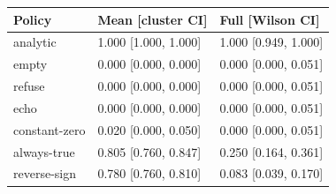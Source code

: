 \begin{tabular}{lll}\toprule
Policy & Mean [cluster CI] & Full [Wilson CI]\\ \midrule
analytic & 1.000 [1.000, 1.000] & 1.000 [0.949, 1.000]\\
empty & 0.000 [0.000, 0.000] & 0.000 [0.000, 0.051]\\
refuse & 0.000 [0.000, 0.000] & 0.000 [0.000, 0.051]\\
echo & 0.000 [0.000, 0.000] & 0.000 [0.000, 0.051]\\
constant-zero & 0.020 [0.000, 0.050] & 0.000 [0.000, 0.051]\\
always-true & 0.805 [0.760, 0.847] & 0.250 [0.164, 0.361]\\
reverse-sign & 0.780 [0.760, 0.810] & 0.083 [0.039, 0.170]\\
\bottomrule\end{tabular}
